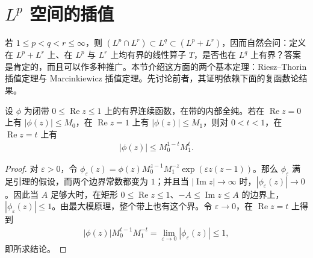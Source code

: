 \documentclass[../../main.tex]{subfiles}
\begin{document}
\section{$L^p$ 空间的插值}\label{section:ch06-lp-interpolation}
若 $1\leqslant p<q<r\leqslant\infty$，则 $(L^p\cap L^r)\subset L^q\subset(L^p+L^r)$，因而自然会问：定义在 $L^p+L^r$ 上、在 $L^p$ 与 $L^r$ 上均有界的线性算子 $T$，是否也在 $L^q$ 上有界？答案是肯定的，而且可以作多种推广。本节介绍这方面的两个基本定理：Riesz–Thorin 插值定理与 Marcinkiewicz 插值定理。先讨论前者，其证明依赖下面的复函数论结果。
\begin{lemma}[三线引理]\label{lemma:ch06-three-lines}
设 $\phi$ 为闭带 $0\leqslant\operatorname{Re}z\leqslant1$ 上的有界连续函数，在带的内部全纯。若在 $\operatorname{Re}z=0$ 上有 $|\phi(z)|\leqslant M_0$，在 $\operatorname{Re}z=1$ 上有 $|\phi(z)|\leqslant M_1$，则对 $0<t<1$，在 $\operatorname{Re}z=t$ 上有
\begin{align*}
|\phi(z)|\leqslant M_0^{1-t}M_1^t.
\end{align*}
\end{lemma}
\begin{proof}
对 $\varepsilon>0$，令 $\phi_\varepsilon(z)=\phi(z)M_0^{z-1}M_1^{-z}\exp(\varepsilon z(z-1))$。那么 $\phi_\varepsilon$ 满足引理的假设，而两个边界常数都变为 $1$；并且当 $|\operatorname{Im}z|\to\infty$ 时，$|\phi_\varepsilon(z)|\to0$。因此当 $A$ 足够大时，在矩形 $0\leqslant\operatorname{Re}z\leqslant1$、$-A\leqslant\operatorname{Im}z\leqslant A$ 的边界上，$|\phi_\varepsilon(z)|\leqslant1$。由最大模原理，整个带上也有这个界。令 $\varepsilon\to0$，在 $\operatorname{Re}z=t$ 上得到
\begin{align*}
|\phi(z)|M_0^{t-1}M_1^{-t}
=\lim_{\varepsilon\to0}|\phi_\varepsilon(z)|\leqslant1,
\end{align*}
即所求结论。
\end{proof}
\end{document}
